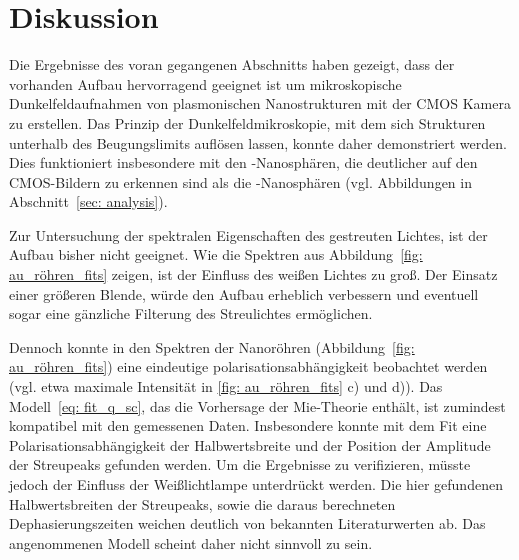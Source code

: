 \section{Diskussion}
Die Ergebnisse des voran gegangenen Abschnitts haben gezeigt, dass der vorhanden Aufbau hervorragend geeignet ist
um mikroskopische Dunkelfeldaufnahmen von plasmonischen Nanostrukturen mit der CMOS Kamera zu erstellen. Das Prinzip
der Dunkelfeldmikroskopie, mit dem sich Strukturen unterhalb des Beugungslimits auflösen lassen, konnte daher
demonstriert werden. Dies funktioniert insbesondere mit den -Nanosphären, die
deutlicher auf den CMOS-Bildern zu erkennen sind als die -Nanosphären
(vgl. Abbildungen in Abschnitt~\ref{sec: analysis}).

Zur Untersuchung der spektralen Eigenschaften des gestreuten Lichtes, ist der Aufbau bisher nicht geeignet.
Wie die Spektren aus Abbildung~\ref{fig: au_röhren_fits} zeigen, ist der Einfluss des weißen Lichtes zu groß. Der Einsatz einer
größeren Blende, würde den Aufbau erheblich verbessern und eventuell sogar eine gänzliche Filterung des Streulichtes
ermöglichen.

Dennoch konnte in den Spektren der Nanoröhren (Abbildung~\ref{fig: au_röhren_fits}) eine eindeutige
polarisationsabhängigkeit beobachtet werden (vgl. etwa maximale Intensität in \ref{fig: au_röhren_fits} c) und d)).
Das Modell~\eqref{eq: fit_q_sc}, das die Vorhersage der Mie-Theorie enthält, ist zumindest kompatibel mit den
gemessenen Daten. Insbesondere konnte mit dem Fit eine Polarisationsabhängigkeit der Halbwertsbreite und der Position der
Amplitude der Streupeaks gefunden werden. Um die Ergebnisse zu verifizieren, müsste
jedoch der Einfluss der Weißlichtlampe unterdrückt werden. Die hier gefundenen Halbwertsbreiten der Streupeaks, sowie
die daraus berechneten Dephasierungszeiten weichen deutlich von bekannten Literaturwerten ab. Das angenommenen Modell
scheint daher nicht sinnvoll zu sein.
